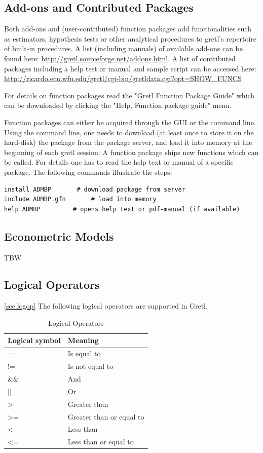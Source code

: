 \documentclass[11pt]{article}
\newcommand{\remph}[1]{{\color{myred}#1}}
\begin{document}
\subsection{Add-ons and Contributed Packages}
Both add-ons and (user-contributed) function packages add functionalities such as estimators, hypothesis tests or other analytical procedures to gretl's repertoire of built-in procedures. A list (including manuals) of available add-ons can be found here: \url{http://gretl.sourceforge.net/addons.html}. A list of contributed packages including a help test or manual and sample script can be accessed here: \url{http://ricardo.ecn.wfu.edu/gretl/cgi-bin/gretldata.cgi?opt=SHOW_FUNCS}

For details on function packages read the "Gretl Function Package Guide" which can be downloaded by clicking the "Help, Function package guide" menu.

Function packages can either be acquired through the GUI or the command line. Using the command line, one needs to download (at least once to store it on the hard-disk) the package from the package server, and load it into memory at the beginning of each gretl session. A function package ships new functions which can be called. For details one has to read the help text or manual of a specific package. The following commands illustrate the steps:
\begin{Verbatim}[baselinestretch=0.75, frame=single, fontsize=\small]
install ADMBP		# download package from server
include ADMBP.gfn	    # load into memory
help ADMBP		   # opens help text or pdf-manual (if available)
\end{Verbatim}




\subsection{Econometric Models}
\remph{TBW}


\subsection{Logical Operators}
\ref{sec:logop}
The following logical operators are supported in Gretl. 

\begin{table}[!h]
	\centering
	\footnotesize
	\begin{tabular}{ll}
		\hline
		Logical symbol & Meaning \\ 
		\hline 
		== & Is equal to \\
		!= & Is not equal to \\ 
		\&\& & And \\
		|| & Or \\
		> & Greater than \\
		>= & Greater than or equal to \\
		< & Less than \\
		<= & Less than or equal to \\
		\hline 
	\end{tabular}
	\caption{Logical Operators}
	\label{tab:logic}
\end{table}
\end{document}
